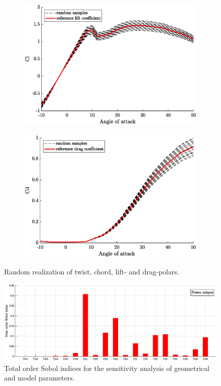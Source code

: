 \documentclass[11pt]{article}
\begin{document}
\begin{figure}[h!]
  \begin{subfigure}[b]{0.4\linewidth}
    \includegraphics[width=\linewidth]{Cl_samples_torque.eps}
  \end{subfigure}
  \begin{subfigure}[b]{0.4\linewidth}
    \includegraphics[width=\linewidth]{Cd_samples_torque}
  \end{subfigure}
  \caption{Random realization of twist, chord, lift- and drag-polars.}
  \label{fig:samples}
\end{figure}
\begin{figure}[h!]
  \centering
    \includegraphics[width=\linewidth]{SA_Power_Chord_Twist_CD_CL_torque.eps}
  \caption{Total order Sobol indices for the sensitivity analysis of geometrical and model parameters.}
   \label{fig:Sobol}
\end{figure}
\end{document}
